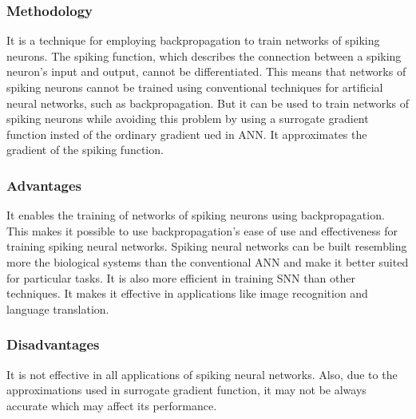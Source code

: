 \subsubsection{Methodology}
It is a technique for employing backpropagation to train networks of spiking
neurons. The spiking function, which describes the connection between a spiking
neuron's input and output, cannot be differentiated. This means that networks
of spiking neurons cannot be trained using conventional techniques for
artificial neural networks, such as backpropagation. But it can be used to
train networks of spiking neurons while avoiding this problem by using a
surrogate gradient function insted of the ordinary gradient ued in ANN. It
approximates the gradient of the spiking function.

\subsubsection{Advantages}
It enables the training of networks of spiking neurons using backpropagation.
This makes it possible to use backpropagation's ease of use and effectiveness
for training spiking neural networks. Spiking neural networks can be built
resembling more the biological systems than the conventional ANN and make it
better suited for particular tasks. It is also more efficient in training SNN
than other techniques. It makes it effective in applications like image
recognition and language translation.
\subsubsection{Disadvantages}
It is not effective in all applications of spiking neural networks. Also, due
to the approximations used in surrogate gradient function, it may not be always
accurate which may affect its performance.